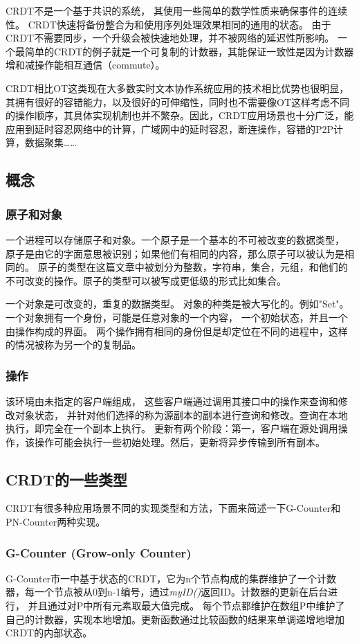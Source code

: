 \documentclass[11pt]{ctexart}
\begin{document}
CRDT不是一个基于共识的系统，
其使用一些简单的数学性质来确保事件的连续性。
CRDT快速将备份整合为和使用序列处理效果相同的通用的状态。
由于CRDT不需要同步，一个升级会被快速地处理，并不被网络的延迟性所影响。
一个最简单的CRDT的例子就是一个可复制的计数器，其能保证一致性是因为计数器增和减操作能相互通信（commute）。

CRDT相比OT这类现在大多数实时文本协作系统应用的技术相比优势也很明显，其拥有很好的容错能力，以及很好的可伸缩性，同时也不需要像OT这样考虑不同的操作顺序，其具体实现机制也并不繁杂。因此，CRDT应用场景也十分广泛，能应用到延时容忍网络中的计算，广域网中的延时容忍，断连操作，容错的P2P计算，数据聚集……

\subsection{概念}
\subsubsection{原子和对象}
一个进程可以存储原子和对象。一个原子是一个基本的不可被改变的数据类型，
原子是由它的字面意思被识别；如果他们有相同的内容，那么原子可以被认为是相同的。
原子的类型在这篇文章中被划分为整数，字符串，集合，元组，和他们的不可改变的操作。原子的类型可以被写成更低级的形式比如集合。

一个对象是可改变的，重复的数据类型。
对象的种类是被大写化的。例如"Set"。
一个对象拥有一个身份，可能是任意对象的一个内容，
一个初始状态，并且一个由操作构成的界面。
两个操作拥有相同的身份但是却定位在不同的进程中，这样的情况被称为另一个的复制品。

\subsubsection{操作}
该环境由未指定的客户端组成，
这些客户端通过调用其接口中的操作来查询和修改对象状态，
并针对他们选择的称为源副本的副本进行查询和修改。查询在本地执行，即完全在一个副本上执行。
更新有两个阶段：第一，客户端在源处调用操作，该操作可能会执行一些初始处理。然后，更新将异步传输到所有副本。

\subsection{CRDT的一些类型}
CRDT有很多种应用场景不同的实现类型和方法，下面来简述一下G-Counter和PN-Counter两种实现。
\subsubsection{G-Counter (Grow-only Counter)}
G-Counter市一中基于状态的CRDT，它为n个节点构成的集群维护了一个计数器，每一个节点被从0到n-1编号，通过\textit{myID()}返回ID。计数器的更新在后台进行，
并且通过对P中所有元素取最大值完成。
每个节点都维护在数组P中维护了自己的计数器，实现本地增加。更新函数通过比较函数的结果来单调递增地增加CRDT的内部状态。
\end{document}
